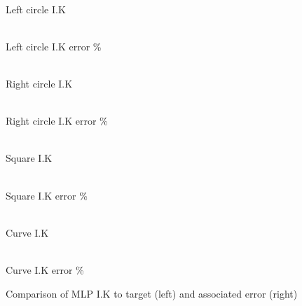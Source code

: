 \documentclass[a4paper,11pt]{article}
\begin{document}
\begin{figure}[H]

\begin{minipage}{.5\linewidth}
\centering
{}\\{Left circle I.K }
\end{minipage}
\begin{minipage}{.5\linewidth}
\centering
{}\\{Left circle I.K error \%}

\end{minipage}\par\medskip

\begin{minipage}{.5\linewidth}
\centering
{}\\{Right circle I.K }
\end{minipage}
\begin{minipage}{.5\linewidth}
\centering
{}\\{Right circle I.K error \%}

\end{minipage}\par\medskip

\begin{minipage}{.5\linewidth}
\centering
{}\\{Square I.K}

\end{minipage}
\begin{minipage}{.5\linewidth}
\centering
{}\\{Square I.K error \%}

\end{minipage}\par\medskip

\begin{minipage}{.5\linewidth}
\centering
{}\\{Curve I.K}

\end{minipage}
\begin{minipage}{.5\linewidth}
\centering
{}\\{Curve I.K error \%}

\end{minipage}
\caption{Comparison of MLP I.K to target (left) and associated error (right)}
\label{fig:MLP}
\end{figure}
\end{document}
